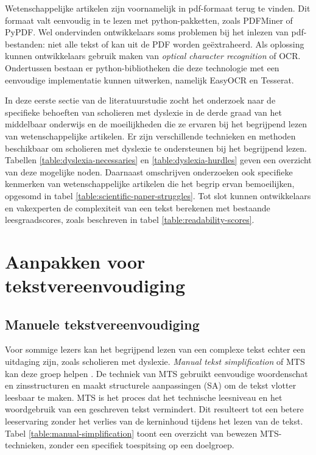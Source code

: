 \medspace

Wetenschappelijke artikelen zijn voornamelijk in pdf-formaat terug te vinden. Dit formaat valt eenvoudig in te lezen met python-pakketten, zoals PDFMiner of PyPDF. Wel ondervinden ontwikkelaars soms problemen bij het inlezen van pdf-bestanden: niet alle tekst of kan uit de PDF worden geëxtraheerd. Als oplossing kunnen ontwikkelaars gebruik maken van \textit{optical character recognition} of OCR. Ondertussen bestaan er python-bibliotheken die deze technologie met een eenvoudige implementatie kunnen uitwerken, namelijk EasyOCR en Tesserat.

\medspace

In deze eerste sectie van de literatuurstudie zocht het onderzoek naar de specifieke behoeften van scholieren met dyslexie in de derde graad van het middelbaar onderwijs en de moeilijkheden die ze ervaren bij het begrijpend lezen van wetenschappelijke artikelen. Er zijn verschillende technieken en methoden beschikbaar om scholieren met dyslexie te ondersteunen bij het begrijpend lezen. Tabellen \ref{table:dyslexia-necessaries} en \ref{table:dyslexia-hurdles} geven een overzicht van deze mogelijke noden. Daarnaast omschrijven onderzoeken ook specifieke kenmerken van wetenschappelijke artikelen die het begrip ervan bemoeilijken, opgesomd in tabel \ref{table:scientific-paper-struggles}. Tot slot kunnen ontwikkelaars en vakexperten de complexiteit van een tekst berekenen met bestaande leesgraadscores, zoals beschreven in tabel \ref{table:readability-scores}.

\section{Aanpakken voor tekstvereenvoudiging}

\subsection{Manuele tekstvereenvoudiging}

Voor sommige lezers kan het begrijpend lezen van een complexe tekst echter een uitdaging zijn, zoals scholieren met dyslexie. \textit{Manual tekst simplification} of MTS kan deze groep helpen \autocite{Siddharthan2014}. De techniek van MTS gebruikt eenvoudige woordenschat en zinsstructuren en maakt structurele aanpassingen (SA) om de tekst vlotter leesbaar te maken. MTS is het proces dat het technische leesniveau en het woordgebruik van een geschreven tekst vermindert. Dit resulteert tot een betere leeservaring zonder het verlies van de kerninhoud tijdens het lezen van de tekst. Tabel \ref{table:manual-simplification} toont een overzicht van bewezen MTS-technieken, zonder een specifiek toespitsing op een doelgroep.

